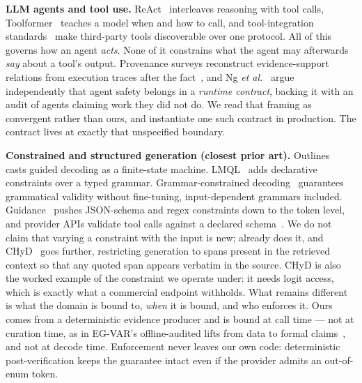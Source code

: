 \documentclass[conference]{IEEEtran}
\begin{document}
\textbf{LLM agents and tool use.} ReAct~\cite{react} interleaves reasoning with tool calls, Toolformer~\cite{toolformer} teaches a model when and how to call, and tool-integration standards~\cite{mcp} make third-party tools discoverable over one protocol. All of this governs how an agent \emph{acts}. None of it constrains what the agent may afterwards \emph{say} about a tool's output. Provenance surveys reconstruct evidence-support relations from execution traces after the fact~\cite{wang2026agenttraces}, and Ng \emph{et al.}~\cite{ng2026runtimecontract} argue independently that agent safety belongs in a \emph{runtime contract}, backing it with an audit of agents claiming work they did not do. We read that framing as convergent rather than ours, and instantiate one such contract in production. The contract lives at exactly that unspecified boundary.

\textbf{Constrained and structured generation (closest prior art).} Outlines~\cite{outlines} casts guided decoding as a finite-state machine. LMQL~\cite{lmql} adds declarative constraints over a typed grammar. Grammar-constrained decoding~\cite{gcd} guarantees grammatical validity without fine-tuning, input-dependent grammars included. Guidance~\cite{guidance} pushes JSON-schema and regex constraints down to the token level, and provider APIs validate tool calls against a declared schema~\cite{structured}. We do not claim that varying a constraint with the input is new; \cite{gcd} already does it, and CHyD~\cite{signe2026chyd} goes further, restricting generation to spans present in the retrieved context so that any quoted span appears verbatim in the source. CHyD is also the worked example of the constraint we operate under: it needs logit access, which is exactly what a commercial endpoint withholds. What remains different is what the domain is bound to, \emph{when} it is bound, and who enforces it. Ours comes from a deterministic evidence producer and is bound at call time --- not at curation time, as in EG-VAR's offline-audited lifts from data to formal claims~\cite{ren2026egvar}, and not at decode time. Enforcement never leaves our own code: deterministic post-verification keeps the guarantee intact even if the provider admits an out-of-enum token.
\end{document}
